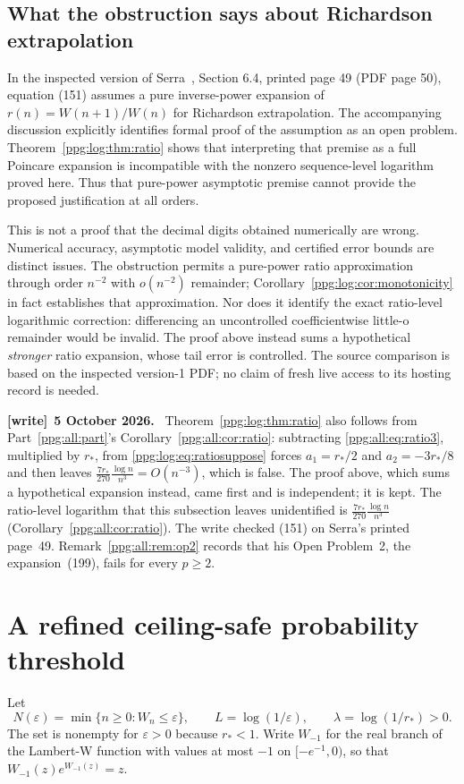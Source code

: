\documentclass[11pt,letterpaper]{article}
\theoremstyle{remark}\newtheorem{remark}[theorem]{Remark}
\numberwithin{equation}{section}
\newenvironment{writenote}[1][]{\par\smallskip\begingroup\small
 \noindent\textbf{[write]}\if\relax\detokenize{#1}\relax\else~\textbf{#1.}\fi\ }%
 {\par\endgroup\smallskip}
\begin{document}
\subsection{What the obstruction says about Richardson extrapolation}
In the inspected version of Serra~\cite{serra}, Section 6.4, printed page 49 (PDF page 50), equation (151) assumes a pure inverse-power expansion of $r(n)=W(n+1)/W(n)$ for Richardson extrapolation. The accompanying discussion explicitly identifies formal proof of the assumption as an open problem. Theorem~\ref{ppg:log:thm:ratio} shows that interpreting that premise as a full Poincare expansion is incompatible with the nonzero sequence-level logarithm proved here. Thus that pure-power asymptotic premise cannot provide the proposed justification at all orders.

This is not a proof that the decimal digits obtained numerically are wrong. Numerical accuracy, asymptotic model validity, and certified error bounds are distinct issues. The obstruction permits a pure-power ratio approximation through order $n^{-2}$ with $o(n^{-2})$ remainder; Corollary~\ref{ppg:log:cor:monotonicity} in fact establishes that approximation. Nor does it identify the exact ratio-level logarithmic correction: differencing an uncontrolled coefficientwise little-o remainder would be invalid. The proof above instead sums a hypothetical \emph{stronger} ratio expansion, whose tail error is controlled. The source comparison is based on the inspected version-1 PDF; no claim of fresh live access to its hosting record is needed.
\begin{writenote}[5 October 2026]
Theorem~\ref{ppg:log:thm:ratio} also follows from Part~\ref{ppg:all:part}'s Corollary~\ref{ppg:all:cor:ratio}: subtracting \eqref{ppg:all:eq:ratio3}, multiplied by $r_*$, from \eqref{ppg:log:eq:ratiosuppose} forces $a_1=r_*/2$ and $a_2=-3r_*/8$ and then leaves $\frac{7r_*}{270}\frac{\log n}{n^3}=O(n^{-3})$, which is false. The proof above, which sums a hypothetical expansion instead, came first and is independent; it is kept. The ratio-level logarithm that this subsection leaves unidentified is $\frac{7r_*}{270}\frac{\log n}{n^3}$ (Corollary~\ref{ppg:all:cor:ratio}). The write checked (151) on Serra's printed page~49. Remark~\ref{ppg:all:rem:op2} records that his Open Problem~2, the expansion~(199), fails for every $p\ge2$.
\end{writenote}

\section{A refined ceiling-safe probability threshold}\label{ppg:log:sec:inverse}
Let
\[
 N(\varepsilon)=\min\{n\ge0:W_n\le\varepsilon\},\qquad
 L=\log(1/\varepsilon),\qquad\lambda=\log(1/r_*)>0.
\]
The set is nonempty for $\varepsilon>0$ because $r_*<1$. Write $W_{-1}$ for the real branch of the Lambert-W function with values at most $-1$ on $[-e^{-1},0)$, so that $W_{-1}(z)e^{W_{-1}(z)}=z$.
\end{document}
